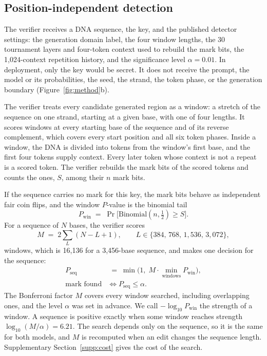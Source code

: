 \documentclass[10pt,twocolumn]{article}
\begin{document}
\subsection{Position-independent detection}
\label{sec:detection}

The verifier receives a DNA sequence, the key, and the published detector settings: the
generation domain label, the four window lengths, the 30 tournament layers and four-token context
used to rebuild the mark bits, the 1{,}024-context repetition history, and the significance level
$\alpha = 0.01$. In deployment, only the key would be secret.
It does not receive the prompt, the model or its probabilities, the seed, the strand, the token
phase, or the generation boundary (Figure~\ref{fig:method}b).

The verifier treats every candidate generated region as a window: a stretch of the sequence on one
strand, starting at a given base, with one of four lengths. It scores windows at every starting
base of the sequence and of its reverse complement, which covers every start position and all six
token phases. Inside a window, the DNA is divided into tokens from the window's first base, and the
first four tokens supply context. Every later token whose context is not a repeat is a scored
token. The verifier rebuilds the mark bits of the scored tokens and counts the ones, $S$, among
their $n$ mark bits.

If the sequence carries no mark for this key, the mark bits behave as independent fair coin flips, and
the window $P$-value is the binomial tail
\begin{equation}
P_{\mathrm{win}} \;=\; \Pr\bigl[\mathrm{Binomial}(n, \tfrac{1}{2}) \geq S\bigr].
\end{equation}
For a sequence of $N$ bases, the verifier scores
\begin{equation}
M \;=\; 2\sum_{L} (N - L + 1), \qquad L \in \{384,\, 768,\, 1{,}536,\, 3{,}072\},
\end{equation}
windows, which is 16{,}136 for a 3{,}456-base sequence, and makes one decision for the sequence:
\begin{equation}
\begin{aligned}
P_{\mathrm{seq}} &\;=\; \min\bigl(1,\; M \cdot \min_{\text{windows}} P_{\mathrm{win}}\bigr),\\
\text{mark found} &\iff P_{\mathrm{seq}} \leq \alpha .
\end{aligned}
\end{equation}
The Bonferroni factor $M$ covers every window searched, including overlapping ones, and the level
$\alpha$ was set in advance. We call $-\log_{10} P_{\mathrm{win}}$ the strength of a window.
A sequence is positive exactly when some window reaches strength $\log_{10}(M/\alpha) = 6.21$. The
search depends only on the sequence, so it is the same for both models, and $M$ is recomputed when an
edit changes the sequence length. Supplementary Section~\ref{supp:cost} gives the cost of the search.
\end{document}
